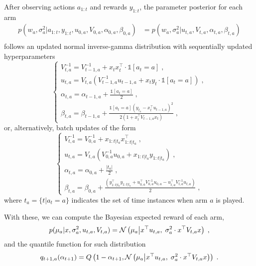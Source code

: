 After observing actions $a_{1:t}$ and rewards $y_{1:t}$, the parameter posterior for each arm 
\begin{equation}
\begin{split}
p(w_a, \sigma_a^2|a_{1:t},y_{1:t},u_{0,a}, V_{0,a},\alpha_{0,a}, \beta_{0,a}) &= p\left(w_a, \sigma_a^2|u_{t,a}, V_{t,a},\alpha_{t,a}, \beta_{t,a}\right) \\
\end{split}
\end{equation}
follows an updated normal inverse-gamma distribution with sequentially updated hyperparameters
\begin{equation}
\begin{cases}
V_{t,a}^{-1} = V_{t-1,a}^{-1} + x_t x_t^\top \cdot \mathds{1}[a_t=a] \; ,\\
u_{t,a}= V_{t,a} \left( V_{t-1,a}^{-1} u_{t-1,a} + x_t y_{t}\cdot \mathds{1}[a_t=a]\right) \; ,\\
\alpha_{t,a}=\alpha_{t-1,a} + \frac{\mathds{1}[a_t=a]}{2} \; ,\\
\beta_{t,a}=\beta_{t-1,a} + \frac{\mathds{1}[a_t=a](y_{t_a}-x_t^\top u_{t-1,a})^2}{2\left(1+x_t^\top V_{t-1,a} x_t\right)} \; ,
\end{cases}
\end{equation}
or, alternatively, batch updates of the form
\begin{equation}
\begin{cases}
V_{t,a}^{-1}= V_{0,a}^{-1}+x_{{1:t}|t_a} x_{{1:t}|t_a}^\top \; ,\\
u_{t,a}=V_{t,a}\left(V_{0,a}^{-1}u_{0,a}+x_{{1:t}|t_a} y_{{1:t}|t_a}\right) \; ,\\
\alpha_{t,a}=\alpha_{0,a} + \frac{|t_a|}{2} \; ,\\
\beta_{t,a}=\beta_{0,a} + \frac{\left(y_{{1:t}|t_a}^\top y_{{1:t}|t_a} + u_{0,a}^\top V_{0,a}^{-1}u_{0,a} - u_{t,a}^\top V_{t,a}^{-1}u_{t,a} \right)}{2} \; ,
\end{cases}
\end{equation}
where $t_a=\{t|a_t=a\}$ indicates the set of time instances when arm $a$ is played.

With these, we can compute the Bayesian expected reward of each arm,
\begin{equation}
p(\mu_{a}|x, \sigma_a^2, u_{t,a}, V_{t,a}) = \mathcal{N}\left( \mu_{a} \middle|x^\top u_{t,a}, \; \sigma_a^2 \cdot x^\top V_{t,a} x\right) \; ,
\label{eq:gaussian_posterior_mean}
\end{equation}
and the quantile function for such distribution
\begin{equation}
q_{t+1,a}(\alpha_{t+1})=Q\left(1-\alpha_{t+1}, \mathcal{N}\left( \mu_{a} \middle|x^\top u_{t,a}, \; \sigma_a^2 \cdot x^\top V_{t,a} x\right)\right) \;.
\label{eq:gaussian_posterior_quantile}
\end{equation}

